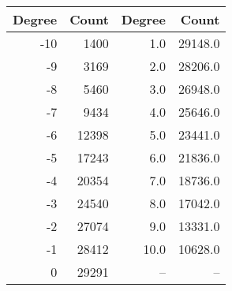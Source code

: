 \begin{tabular}{rrrr}
\toprule
 Degree &  Count &  Degree &  Count \\
\midrule
    -10 &   1400 &       1.0 &  29148.0 \\
     -9 &   3169 &       2.0 &  28206.0 \\
     -8 &   5460 &       3.0 &  26948.0 \\
     -7 &   9434 &       4.0 &  25646.0 \\
     -6 &  12398 &       5.0 &  23441.0 \\
     -5 &  17243 &       6.0 &  21836.0 \\
     -4 &  20354 &       7.0 &  18736.0 \\
     -3 &  24540 &       8.0 &  17042.0 \\
     -2 &  27074 &       9.0 &  13331.0 \\
     -1 &  28412 &      10.0 &  10628.0 \\
      0 &  29291 &       -- &      -- \\
\bottomrule
\end{tabular}
